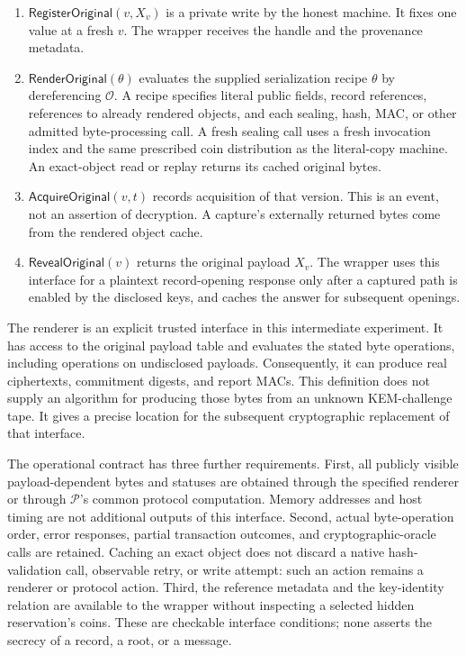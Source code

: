 \begin{enumerate}
  \item $\mathsf{RegisterOriginal}(v,X_v)$ is a private write by the honest
  machine.  It fixes one value at a fresh $v$.  The wrapper receives the
  handle and the provenance metadata.
  \item $\mathsf{RenderOriginal}(\theta)$ evaluates the supplied serialization
  recipe $\theta$ by dereferencing $\mathcal O$.  A recipe specifies literal
  public fields, record references, references to already rendered objects,
  and each sealing, hash, MAC, or other admitted byte-processing call.
  A fresh sealing call uses a fresh invocation index and the same prescribed
  coin distribution as the literal-copy machine.  An exact-object read or
  replay returns its cached original bytes.
  \item $\mathsf{AcquireOriginal}(v,t)$ records acquisition of that version.
  This is an event, not an assertion of decryption.  A capture's externally
  returned bytes come from the rendered object cache.
  \item $\mathsf{RevealOriginal}(v)$ returns the original payload $X_v$.
  The wrapper uses this interface for a plaintext record-opening response
  only after a captured path is enabled by the disclosed keys, and caches
  the answer for subsequent openings.
\end{enumerate}

The renderer is an explicit trusted interface in this intermediate
experiment.  It has access to the original payload table and evaluates the
stated byte operations, including operations on undisclosed payloads.
Consequently, it can produce real ciphertexts, commitment digests, and report
MACs.  This definition does not supply an algorithm for producing those bytes
from an unknown KEM-challenge tape.  It gives a precise location for the
subsequent cryptographic replacement of that interface.

The operational contract has three further requirements.
First, all publicly visible payload-dependent bytes and statuses are obtained
through the specified renderer or through $\mathcal P$'s common protocol
computation.  Memory addresses and host timing are not additional outputs of
this interface.
Second, actual byte-operation order, error responses, partial transaction
outcomes, and cryptographic-oracle calls are retained.  Caching an exact
object does not discard a native hash-validation call, observable retry, or
write attempt: such an action remains a renderer or protocol action.
Third, the reference metadata and the key-identity relation are available to
the wrapper without inspecting a selected hidden reservation's coins.
These are checkable interface conditions; none asserts the secrecy of a
record, a root, or a message.

